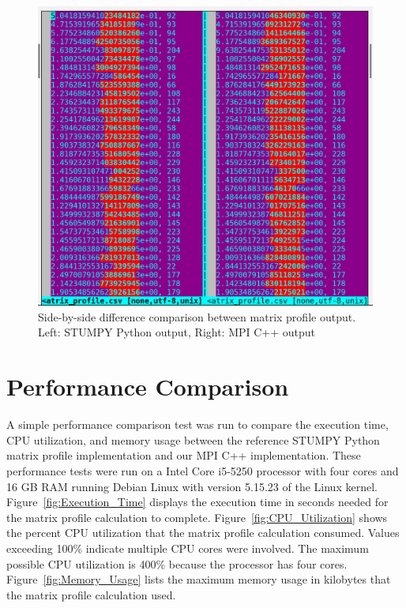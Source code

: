 \documentclass[conference]{IEEEtran}
\begin{document}
\begin{figure}
\begin{center}
\includegraphics[scale=0.45]{matrix_profile_diff.png}
\caption{Side-by-side difference comparison between matrix profile output.   Left: STUMPY Python output, Right: MPI C++ output}
\label{fig:Matrix_Profile_Diff}
\end{center}
\end{figure}

\section{Performance Comparison}

A simple performance comparison test was run to compare the execution time, CPU utilization, and memory usage between the reference STUMPY Python matrix profile implementation and our MPI C++ implementation.  These performance tests were run on a Intel Core i5-5250 processor with four cores and 16 GB RAM running Debian Linux with version 5.15.23 of the Linux kernel.  Figure~\ref{fig:Execution_Time} displays the execution time in seconds needed for the matrix profile calculation to complete. Figure~\ref{fig:CPU_Utilization} shows the percent CPU utilization that the matrix profile calculation consumed.  Values exceeding 100\% indicate multiple CPU cores were involved.  The maximum possible CPU utilization is 400\% because the processor has four cores. Figure~\ref{fig:Memory_Usage} lists the maximum memory usage in kilobytes that the matrix profile calculation used. 
\end{document}
